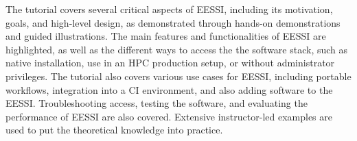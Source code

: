 

The tutorial covers several critical aspects of EESSI, including its motivation, goals, and high-level design, as demonstrated through hands-on demonstrations and guided illustrations. The main features and functionalities of EESSI are highlighted, as well as the different ways to access the the software stack, such as native installation, use in an HPC production setup, or without administrator privileges. The tutorial also covers various use cases for EESSI, including portable workflows, integration into a CI environment, and also adding software to the EESSI. Troubleshooting access, testing the software, and evaluating the performance of EESSI are also covered. Extensive instructor-led examples are used to put the theoretical knowledge into practice.

